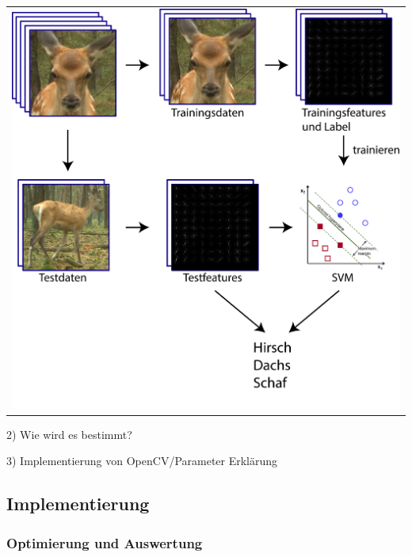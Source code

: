 \begin{center}
\begin{tabular}{c}
\includegraphics[trim={0 0cm 0cm 0cm},clip=true,width=13cm]{img/ClassificationOverview.png}
\end{tabular}
\label{fig:hog_classification_ov}
\end{center}

2) Wie wird es bestimmt?

3) Implementierung von OpenCV/Parameter Erklärung

\subsection{Implementierung}

\subsubsection{Optimierung und Auswertung}


